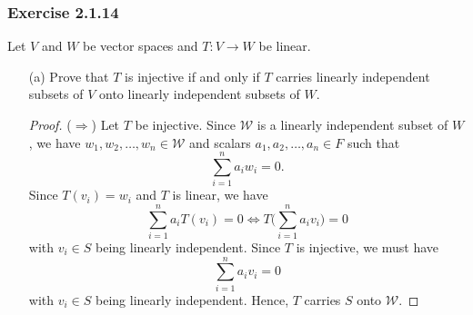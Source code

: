 \subsubsection{Exercise 2.1.14} Let \( V \) and \( W \) be vector spaces and \( T: V \to W  \) be linear.
\begin{enumerate}
    \item[(a)] Prove that \( T \) is injective if and only if \( T  \) carries linearly independent subsets of \( V  \) onto linearly independent subsets of \( W  \).
        \begin{proof}
            (\( \Rightarrow \)) Let \( T \) be injective. Since \( \mathcal{W} \) is a linearly independent subset of \( W  \), we have \( {w}_{1}, {w}_{2}, \dots, {w}_{n} \in \mathcal{W}  \) and scalars \( {a}_{1}, {a}_{2}, \dots, {a}_{n} \in F \) such that 
            \[  \sum_{ i=1 }^{ n } {a}_{i} {w}_{i} = 0. \]
            Since \( T({v}_{i}) = {w}_{i}  \) and \( T  \) is linear, we have
            \[ \sum_{ i=1 }^{ n } {a}_{i}T({v}_{i}) = 0 \iff T \Big( \sum_{ i=1 }^{ n } {a}_{i}{v}_{i} \Big) = 0  \]
            with \( {v}_{i} \in S  \) being linearly independent.
            Since \( T  \) is injective, we must have
            \[  \sum_{ i=1 }^{ n } {a}_{i} {v}_{i} = 0  \]
            with \( {v}_{i} \in S  \) being linearly independent.
            Hence, \( T  \) carries \( S  \) onto \( \mathcal{W} \).


\end{proof}
\end{enumerate}
